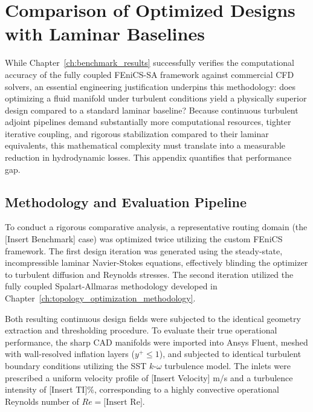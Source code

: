 \chapter{Comparison of Optimized Designs with Laminar Baselines}
\label{app:laminar_turbulent_topology_comparison}

\providecommand{\validationplaceholder}[1]{%
	\fbox{\parbox[c][0.22\textheight][c]{0.88\linewidth}{\centering \textbf{Placeholder}\\[0.5em]#1}}%
}

While Chapter~\ref{ch:benchmark_results} successfully verifies the computational accuracy of the fully coupled FEniCS-SA framework against commercial CFD solvers, an essential engineering justification underpins this methodology: does optimizing a fluid manifold under turbulent conditions yield a physically superior design compared to a standard laminar baseline? Because continuous turbulent adjoint pipelines demand substantially more computational resources, tighter iterative coupling, and rigorous stabilization compared to their laminar equivalents, this mathematical complexity must translate into a measurable reduction in hydrodynamic losses. This appendix quantifies that performance gap.

\section{Methodology and Evaluation Pipeline}
\label{sec:app_lam_vs_turb_methodology}
To conduct a rigorous comparative analysis, a representative routing domain (the [Insert Benchmark] case) was optimized twice utilizing the custom FEniCS framework. The first design iteration was generated using the steady-state, incompressible laminar Navier-Stokes equations, effectively blinding the optimizer to turbulent diffusion and Reynolds stresses. The second iteration utilized the fully coupled Spalart-Allmaras methodology developed in Chapter~\ref{ch:topology_optimization_methodology}. 

Both resulting continuous design fields were subjected to the identical geometry extraction and thresholding procedure. To evaluate their true operational performance, the sharp CAD manifolds were imported into Ansys Fluent, meshed with wall-resolved inflation layers ($y^+ \le 1$), and subjected to identical turbulent boundary conditions utilizing the SST $k$-$\omega$ turbulence model. The inlets were prescribed a uniform velocity profile of [Insert Velocity] m/s and a turbulence intensity of [Insert TI]\%, corresponding to a highly convective operational Reynolds number of $Re = \text{[Insert Re]}$.

